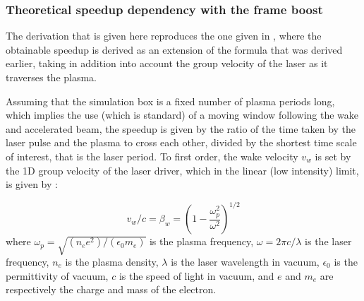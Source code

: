 \documentclass[]{report}
\begin{document}
\subsubsection{Theoretical speedup dependency with the frame boost}
The derivation that is given here reproduces the one given in \cite{Vaypop2011}, where the obtainable speedup is derived as an extension of the formula that was derived earlier\cite{Vayprl07}, taking in addition into account the group velocity of the laser as it traverses the plasma.  

Assuming that the simulation box is a fixed number of plasma periods long, which implies the use (which is standard) of a moving window following 
the wake and accelerated beam, the speedup is given by the ratio of the time taken by the laser pulse and the plasma to cross each other, divided by the shortest time scale of interest, that is the laser period. To first order, the wake velocity $v_w$ is set by the 1D group velocity of the laser driver, which in the linear (low intensity) limit, is given by \cite{Esareyrmp09}:

%
\begin{equation}
v_w/c=\beta_w=\left(1-\frac{\omega_p^2}{\omega^2}\right)^{1/2}
\end{equation}
%
where $\omega_p=\sqrt{(n_e e^2)/(\epsilon_0 m_e)}$ is the plasma frequency, $\omega=2\pi c/\lambda$ is the laser frequency, $n_e$ is the plasma density, $\lambda$ is the laser wavelength in vacuum, $\epsilon_0$ is the permittivity of vacuum, $c$ is the speed of light in vacuum, and $e$ and $m_e$ are respectively the charge and mass of the electron.
\end{document}
